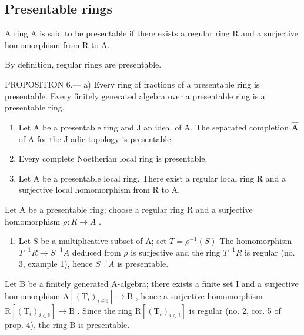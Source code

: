 \subsection{Presentable rings}

A ring A is said to be presentable if there exists a regular ring R and a surjective homomorphism from R to A.

By definition, regular rings are presentable.

PROPOSITION 6.--- a) Every ring of fractions of a presentable ring is presentable. Every finitely generated algebra over a presentable ring is a presentable ring.

\begin{enumerate}
\def\labelenumi{\alph{enumi})}
\setcounter{enumi}{1}
\item
  Let A be a presentable ring and J an ideal of A. The separated completion \(\widehat{\mathbf{A}}\) of A for the J-adic topology is presentable.
\item
  Every complete Noetherian local ring is presentable.
\item
  Let A be a presentable local ring. There exist a regular local ring R and a surjective local homomorphism from R to A.
\end{enumerate}

Let A be a presentable ring; choose a regular ring R and a surjective homomorphism \(\rho: R \to A\) .

\begin{enumerate}
\def\labelenumi{\alph{enumi})}
\tightlist
\item
  Let S be a multiplicative subset of A; set \(T = \rho^{-1}(S)\) The homomorphism \(T^{-1}R \to S^{-1}A\) deduced from \(\rho\) is surjective and the ring \(T^{-1}R\) is regular (no. 3, example 1), hence \(S^{-1}A\) is presentable.
\end{enumerate}

Let B be a finitely generated A-algebra; there exists a finite set I and a surjective homomorphism \(\mathrm{A}[(\mathrm{T}_{i})_{i\in\mathbb{I}}]\to\mathrm{B}\) , hence a surjective homomorphism \(\mathrm{R}[(\mathrm{T}_{i})_{i\in\mathbb{I}}]\to\mathrm{B}\) . Since the ring \(\mathrm{R}[(\mathrm{T}_{i})_{i\in\mathbb{I}}]\) is regular (no. 2, cor. 5 of prop. 4), the ring B is presentable.

